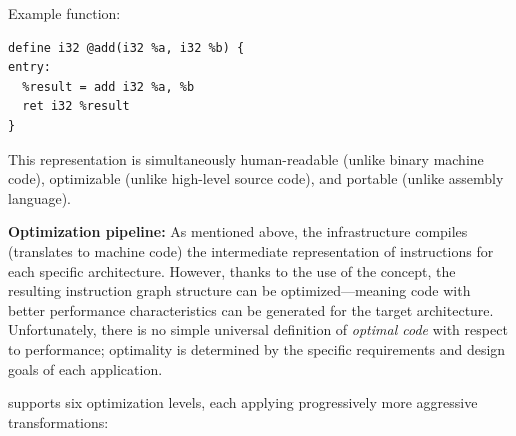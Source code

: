 Example   function:
\begin{lstlisting}[style=ir]
define i32 @add(i32 %a, i32 %b) {
entry:
  %result = add i32 %a, %b
  ret i32 %result
}
\end{lstlisting}

This representation is simultaneously human-readable (unlike binary machine code), optimizable (unlike high-level source code), and portable (unlike assembly language).

\textbf{Optimization pipeline:} As mentioned above, the  infrastructure compiles (translates to machine code) the intermediate representation of instructions for each specific architecture. However, thanks to the use of the  concept, the resulting instruction graph structure can be optimized—meaning code with better performance characteristics can be generated for the target architecture. Unfortunately, there is no simple universal definition of \textit{optimal code} with respect to performance; optimality is determined by the specific requirements and design goals of each application.

 supports six optimization levels, each applying progressively more aggressive transformations:

